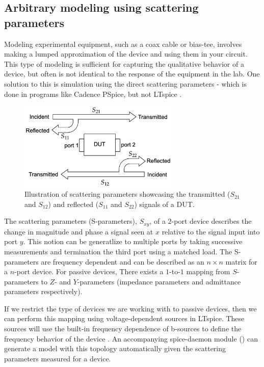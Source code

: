 \subsection{Arbitrary modeling using scattering parameters}

Modeling experimental equipment, such as a coax cable or bias-tee, involves making a 
lumped approximation of the device and using them in your circuit. 
This type of modeling is sufficient for capturing the qualitative behavior of a device,
but often is not identical to the response of the equipment in the lab.
One solution to this is simulation using the direct scattering parameters - which is
done in programs like Cadence PSpice, but not LTspice .


\begin{figure}[h]
    \centering
    \includegraphics[width=3in]{figs/sxy_diagram.png}
    \caption{Illustration of scattering parameters showcasing the transmitted ($S_{21}$ and $S_{12}$) and reflected ($S_{11}$ and $S_{22}$) signals of a DUT.}
    \label{fig:sxy}
\end{figure}

The scattering parameters (S-parameters), $S_{xy}$, of a $2$-port device describes the
change in magnitude and phase a signal seen at $x$ relative to the signal 
input into port $y$. This notion can be generatlize to multiple ports
by taking successive measurements and termination the third port using a
matched load. The S-parameters are frequency dependent and can be described
as an $n\times n$ matrix for a $n$-port device. For passive devices, There exists a 
$1$-to-$1$ mapping from $S$-parameters to $Z$- and $Y$-parameters (impedance 
parameters and admittance parameters respectively).

If we restrict the type of devices we are working with to passive devices,
then we can perform this mapping using voltage-dependent sources in 
LTspice. These sources will use the built-in frequency dependence of b-sources to
define the frequency behavior of the device \cite{microsim}. An accompanying spice-daemon
module () can generate a model with this topology
automatically given the scattering parameters measured for a device.

